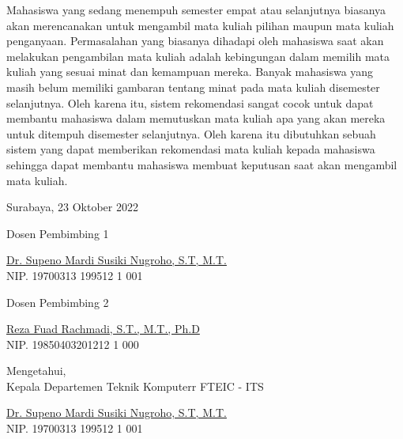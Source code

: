 Mahasiswa yang sedang menempuh semester empat atau selanjutnya biasanya akan merencanakan
untuk mengambil mata kuliah pilihan maupun mata kuliah penganyaan. Permasalahan yang biasanya dihadapi oleh mahasiswa
saat akan melakukan pengambilan mata kuliah adalah kebingungan dalam memilih mata kuliah
yang sesuai minat dan kemampuan mereka. Banyak mahasiswa yang masih belum memiliki gambaran
tentang minat pada mata kuliah disemester selanjutnya. Oleh karena itu, sistem rekomendasi
sangat cocok untuk dapat membantu mahasiswa dalam memutuskan mata kuliah apa yang akan mereka
untuk ditempuh disemester selanjutnya. Oleh karena itu dibutuhkan sebuah sistem yang dapat memberikan
rekomendasi mata kuliah kepada mahasiswa sehingga dapat membantu mahasiswa membuat keputusan saat akan
mengambil mata kuliah.
\vspace{1ex}

\begin{flushright}
  Surabaya, 23 Oktober 2022
\end{flushright}
\vspace{1ex}

\begin{center}

  \begin{multicols}{2}

    Dosen Pembimbing 1
    \vspace{12ex}

    \underline{Dr. Supeno Mardi Susiki Nugroho, S.T, M.T.} \\
    NIP. 19700313 199512 1 001

    \columnbreak

    Dosen Pembimbing 2
    \vspace{12ex}

    \underline{Reza Fuad Rachmadi, S.T., M.T., Ph.D} \\
    NIP. 19850403201212 1 000

  \end{multicols}


  \vspace{6ex}

  Mengetahui, \\
  Kepala Departemen Teknik Komputerr FTEIC - ITS
  \vspace{12ex}

  \underline{Dr. Supeno Mardi Susiki Nugroho, S.T, M.T.} \\
  NIP. 19700313 199512 1 001

\end{center}
